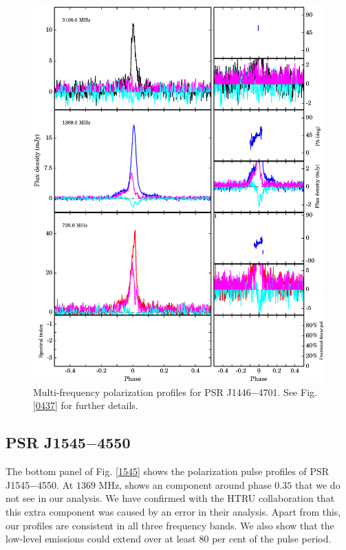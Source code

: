 \documentclass[useAMS,usenatbib]{mn2e}
\begin{document}
\begin{figure}
\begin{center}
\includegraphics[width=6 in]{1446.ps}
\caption{Multi-frequency polarization profiles for PSR J1446$-$4701. 
See Fig. \ref{0437} for further details.}
\label{1446}
\end{center}
\end{figure}

\subsection{PSR J1545$-$4550}

The bottom panel of Fig. \ref{1545} shows the polarization pulse profiles of 
PSR J1545$-$4550.
%
At $1369$ MHz, \citet{Burgay13} shows an component around phase $0.35$ that 
we do not see in our analysis. We have confirmed with the HTRU collaboration 
that this extra component was caused by an error in their analysis.  
%
Apart from this, our profiles are consistent in all three frequency bands.
%
We also show that the low-level emissions could extend over at least $80$ 
per cent of the pulse period.
\end{document}
